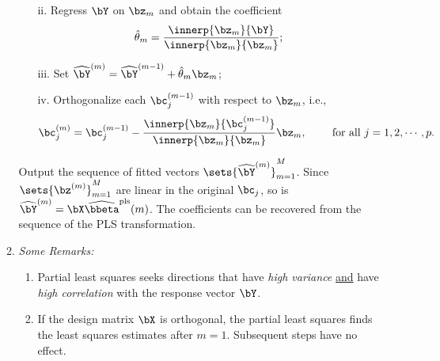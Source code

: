 \documentclass[12pt]{article}
\begin{document}
\begin{enumerate}[label=\textbf{\arabic*.}]
\begin{enumerate}
\begin{minipage}{\linewidth}
\begin{algorithm}[H]
\begin{algorithmic}[1]
\begin{enumerate}
				\vspace{5pt}
				\item[ii.] Regress $\bY$ on $\bz_m$ and obtain the coefficient 
				\begin{align*}
					\hat{\theta}_m = \frac{\innerp{\bz_m}{\bY}}{\innerp{\bz_m}{\bz_m}}; 
				\end{align*}
				\vspace{5pt}
				\item[iii.] Set $\widehat{\bY}^{(m)} = \widehat{\bY}^{(m - 1)} + \hat{\theta}_m \bz_m$; 
				\vspace{5pt}
				\item[iv.] Orthogonalize each $\bc_j^{(m-1)}$ with respect to $\bz_m$, i.e., 
				\begin{align*}
					\bc_j^{(m)} = \bc_j^{(m-1)} - \frac{\innerp{\bz_m}{\bc_j^{(m-1)}}}{\innerp{\bz_m}{\bz_m}} \bz_m, \qquad \text{ for all } j = 1, 2, \cdots, p. 
				\end{align*}
			\end{enumerate}
			
			\vspace{5pt}
			\STATE Output the sequence of fitted vectors $\sets{\widehat{\bY}^{(m)}}_{m=1}^M$. Since $\sets{\bz^{(m)}}_{m=1}^M$ are linear in the original $\bc_j$, so is $\widehat{\bY}^{(m)} = \bX \widehat{\bbeta}^{\mathrm{pls}} (m)$. The coefficients can be recovered from the sequence of the PLS transformation. 

		\end{algorithmic}
		\end{algorithm}
	\end{minipage}
	
	\vspace{10pt}
	
	\item \textit{Some Remarks:} 
	\begin{enumerate}
		\item Partial least squares seeks directions that have \emph{high variance} \underline{and} have \emph{high correlation} with the response vector $\bY$. 
		\item If the design matrix $\bX$ is orthogonal, the partial least squares finds the least squares estimates after $m = 1$. Subsequent steps have no effect. 
		

\end{enumerate}
\end{enumerate}
\end{enumerate}
\end{document}
